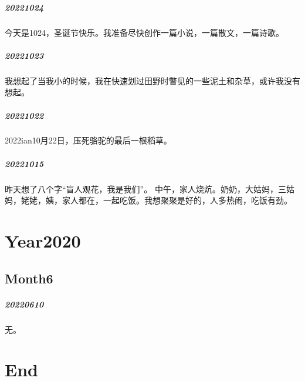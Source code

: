 \documentclass[UTF8]{Diaries}
\begin{document}
\paragraph{20221024}
今天是1024，圣诞节快乐。我准备尽快创作一篇小说，一篇散文，一篇诗歌。

\paragraph{20221023}
我想起了当我小的时候，我在快速划过田野时瞥见的一些泥土和杂草，或许我没有想起。

\paragraph{20221022}
2022ian10月22日，压死骆驼的最后一根稻草。

\paragraph{20221015}
昨天想了八个字“盲人观花，我是我们”。
中午，家人烧炕。奶奶，大姑妈，三姑妈，姥姥，姨，家人都在，一起吃饭。我想聚聚是好的，人多热闹，吃饭有劲。


\chapter{Year2020}
\section{Month6}
\paragraph{20220610}

无。



\chapter{End}
\end{document}
